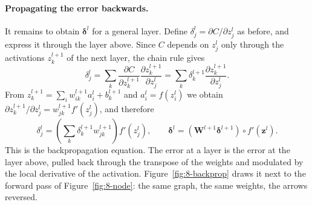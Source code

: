 \paragraph{Propagating the error backwards.}
It remains to obtain $\bm{\delta}^{l}$ for a general layer.  Define
$\delta_j^{l}=\partial C/\partial z_j^{l}$ as before, and express it through
the layer above.  Since $C$ depends on $z_j^{l}$ only through the activations
$z_k^{l+1}$ of the next layer, the chain rule gives
\begin{equation}
  \delta_j^{l}
   = \sum_k \frac{\partial C}{\partial z_k^{l+1}}
            \frac{\partial z_k^{l+1}}{\partial z_j^{l}}
   = \sum_k \delta_k^{l+1}\frac{\partial z_k^{l+1}}{\partial z_j^{l}} .
  \label{eq:8-deltachain}
\end{equation}
From $z_k^{l+1}=\sum_i w_{ik}^{l+1}a_i^{l}+b_k^{l+1}$ and
$a_i^{l}=f(z_i^{l})$ we obtain
$\partial z_k^{l+1}/\partial z_j^{l}=w_{jk}^{l+1}f'(z_j^{l})$, and therefore
\begin{equation}
  \boxed{\;
  \delta_j^{l} = \left(\sum_k \delta_k^{l+1}w_{jk}^{l+1}\right)
                 f'\!\left(z_j^{l}\right),
  \qquad
  \bm{\delta}^{l} = \left(\bm{W}^{l+1}\bm{\delta}^{l+1}\right)
                    \circ f'\!\left(\bm{z}^{l}\right). \;}
  \label{eq:8-deltarecursion}
\end{equation}
This is the backpropagation equation.  The error at a layer is the error at the
layer above, pulled back through the transpose of the weights and modulated by
the local derivative of the activation.  Figure~\ref{fig:8-backprop} draws it
next to the forward pass of Figure~\ref{fig:8-node}: the same graph, the same
weights, the arrows reversed.

